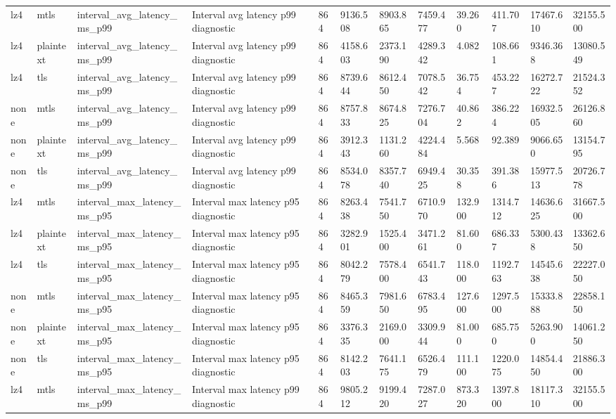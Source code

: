 \begin{longtable}{llllllllllll}
lz4 & mtls & interval\_avg\_latency\_ms\_p99 & Interval avg latency p99 diagnostic & 864 & 9136.508 & 8903.865 & 7459.477 & 39.260 & 411.707 & 17467.610 & 32155.500 \\
lz4 & plaintext & interval\_avg\_latency\_ms\_p99 & Interval avg latency p99 diagnostic & 864 & 4158.603 & 2373.190 & 4289.342 & 4.082 & 108.661 & 9346.368 & 13080.549 \\
lz4 & tls & interval\_avg\_latency\_ms\_p99 & Interval avg latency p99 diagnostic & 864 & 8739.644 & 8612.450 & 7078.542 & 36.754 & 453.227 & 16272.722 & 21524.352 \\
none & mtls & interval\_avg\_latency\_ms\_p99 & Interval avg latency p99 diagnostic & 864 & 8757.833 & 8674.825 & 7276.704 & 40.862 & 386.224 & 16932.505 & 26126.860 \\
none & plaintext & interval\_avg\_latency\_ms\_p99 & Interval avg latency p99 diagnostic & 864 & 3912.343 & 1131.260 & 4224.484 & 5.568 & 92.389 & 9066.650 & 13154.795 \\
none & tls & interval\_avg\_latency\_ms\_p99 & Interval avg latency p99 diagnostic & 864 & 8534.078 & 8357.740 & 6949.425 & 30.358 & 391.386 & 15977.513 & 20726.778 \\
lz4 & mtls & interval\_max\_latency\_ms\_p95 & Interval max latency p95 diagnostic & 864 & 8263.438 & 7541.750 & 6710.970 & 132.900 & 1314.712 & 14636.625 & 31667.500 \\
lz4 & plaintext & interval\_max\_latency\_ms\_p95 & Interval max latency p95 diagnostic & 864 & 3282.901 & 1525.400 & 3471.261 & 81.600 & 686.337 & 5300.438 & 13362.650 \\
lz4 & tls & interval\_max\_latency\_ms\_p95 & Interval max latency p95 diagnostic & 864 & 8042.279 & 7578.400 & 6541.743 & 118.000 & 1192.763 & 14545.638 & 22227.050 \\
none & mtls & interval\_max\_latency\_ms\_p95 & Interval max latency p95 diagnostic & 864 & 8465.359 & 7981.650 & 6783.495 & 127.600 & 1297.500 & 15333.888 & 22858.150 \\
none & plaintext & interval\_max\_latency\_ms\_p95 & Interval max latency p95 diagnostic & 864 & 3376.335 & 2169.000 & 3309.944 & 81.000 & 685.750 & 5263.900 & 14061.250 \\
none & tls & interval\_max\_latency\_ms\_p95 & Interval max latency p95 diagnostic & 864 & 8142.203 & 7641.175 & 6526.479 & 111.100 & 1220.075 & 14854.450 & 21886.300 \\
lz4 & mtls & interval\_max\_latency\_ms\_p99 & Interval max latency p99 diagnostic & 864 & 9805.212 & 9199.420 & 7287.027 & 873.320 & 1397.800 & 18117.310 & 32155.500 \\

\end{longtable}
